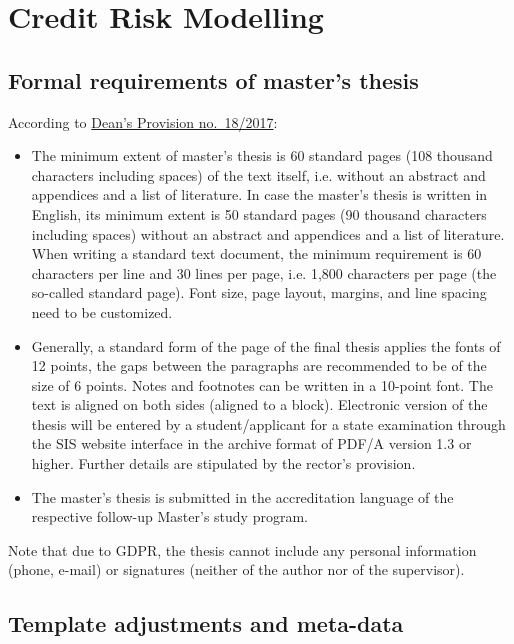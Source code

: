 \chapter{Credit Risk Modelling}
\label{chap:two}


\section{Formal requirements of master's thesis}
\label{sec:formal}

According to \href{https://www.fsv.cuni.cz/deans-provision-no-182017}{Dean's Provision no.\ 18/2017}:
\begin{itemize}
		\item  The minimum extent of master's thesis is 60 standard pages (108 thousand characters including spaces) of the text itself, i.e. without an abstract and appendices and a list of literature. 
		In case the master's thesis is written in English, its minimum extent is 50 standard pages (90 thousand characters including spaces) without an abstract and appendices and a list of literature. 
		When writing a standard text document, the minimum requirement is 60 characters per line and 30 lines per page, i.e. 1,800 characters per page (the so-called standard page). 
		Font size, page layout, margins, and line spacing need to be customized.
		\item Generally, a standard form of the page of the final thesis applies the fonts of 12 points, the gaps between the paragraphs are recommended to be of the size of 6 points. 
		Notes and footnotes can be written in a 10-point font.
		The text is aligned on both sides (aligned to a block). 
		Electronic version of the thesis will be entered by a student/applicant for a state examination through the SIS website interface in the archive format of PDF/A version 1.3 or higher. 
		Further details are stipulated by the rector's provision.
		\item The master's thesis is submitted in the accreditation language of the respective follow-up Master's study program. 
\end{itemize}

Note that due to GDPR, the thesis cannot include any personal information (phone, e-mail) or signatures (neither of the author nor of the supervisor).

\section{Template adjustments and meta-data}
\label{sec:metadata}

